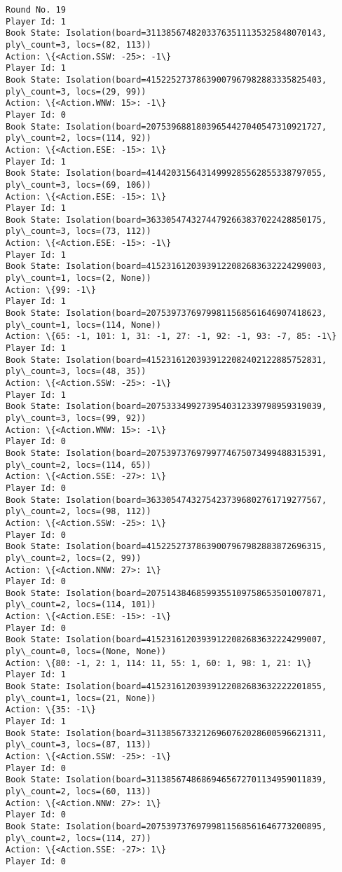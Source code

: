 \documentclass[11pt]{article}
\begin{document}
\begin{Verbatim}[commandchars=\\\{\}]
Round No. 19
Player Id: 1
Book State: Isolation(board=31138567482033763511135325848070143, ply\_count=3, locs=(82, 113))
Action: \{<Action.SSW: -25>: -1\}
Player Id: 1
Book State: Isolation(board=41522527378639007967982883335825403, ply\_count=3, locs=(29, 99))
Action: \{<Action.WNW: 15>: -1\}
Player Id: 0
Book State: Isolation(board=20753968818039654427040547310921727, ply\_count=2, locs=(114, 92))
Action: \{<Action.ESE: -15>: 1\}
Player Id: 1
Book State: Isolation(board=41442031564314999285562855338797055, ply\_count=3, locs=(69, 106))
Action: \{<Action.ESE: -15>: 1\}
Player Id: 1
Book State: Isolation(board=36330547432744792663837022428850175, ply\_count=3, locs=(73, 112))
Action: \{<Action.ESE: -15>: -1\}
Player Id: 1
Book State: Isolation(board=41523161203939122082683632224299003, ply\_count=1, locs=(2, None))
Action: \{99: -1\}
Player Id: 1
Book State: Isolation(board=20753973769799811568561646907418623, ply\_count=1, locs=(114, None))
Action: \{65: -1, 101: 1, 31: -1, 27: -1, 92: -1, 93: -7, 85: -1\}
Player Id: 1
Book State: Isolation(board=41523161203939122082402122885752831, ply\_count=3, locs=(48, 35))
Action: \{<Action.SSW: -25>: -1\}
Player Id: 1
Book State: Isolation(board=20753334992739540312339798959319039, ply\_count=3, locs=(99, 92))
Action: \{<Action.WNW: 15>: -1\}
Player Id: 0
Book State: Isolation(board=20753973769799774675073499488315391, ply\_count=2, locs=(114, 65))
Action: \{<Action.SSE: -27>: 1\}
Player Id: 0
Book State: Isolation(board=36330547432754237396802761719277567, ply\_count=2, locs=(98, 112))
Action: \{<Action.SSW: -25>: 1\}
Player Id: 0
Book State: Isolation(board=41522527378639007967982883872696315, ply\_count=2, locs=(2, 99))
Action: \{<Action.NNW: 27>: 1\}
Player Id: 0
Book State: Isolation(board=20751438468599355109758653501007871, ply\_count=2, locs=(114, 101))
Action: \{<Action.ESE: -15>: -1\}
Player Id: 0
Book State: Isolation(board=41523161203939122082683632224299007, ply\_count=0, locs=(None, None))
Action: \{80: -1, 2: 1, 114: 11, 55: 1, 60: 1, 98: 1, 21: 1\}
Player Id: 1
Book State: Isolation(board=41523161203939122082683632222201855, ply\_count=1, locs=(21, None))
Action: \{35: -1\}
Player Id: 1
Book State: Isolation(board=31138567332126960762028600596621311, ply\_count=3, locs=(87, 113))
Action: \{<Action.SSW: -25>: -1\}
Player Id: 0
Book State: Isolation(board=31138567486869465672701134959011839, ply\_count=2, locs=(60, 113))
Action: \{<Action.NNW: 27>: 1\}
Player Id: 0
Book State: Isolation(board=20753973769799811568561646773200895, ply\_count=2, locs=(114, 27))
Action: \{<Action.SSE: -27>: 1\}
Player Id: 0

\end{Verbatim}
\end{document}
